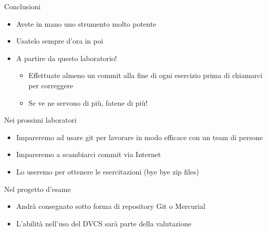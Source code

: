 \documentclass[presentation]{beamer}
\begin{document}
\begin{frame}{Conclusioni}
	\begin{itemize}
		\item Avete in mano uno strumento molto potente
		\item Usatelo sempre d'ora in poi
		\item A partire da questo laboratorio!
		\begin{itemize}
			\item Effettuate almeno un commit alla fine di ogni esercizio prima di chiamarci per correggere
			\item Se ve ne servono di più, fatene di più!
		\end{itemize}
	\end{itemize}
	\begin{block}{Nei prossimi laboratori}
		\begin{itemize}
			\item Impareremo ad usare git per lavorare in modo efficace con un team di persone
			\item Impareremo a scambiarci commit via Internet
			\item Lo useremo per ottenere le esercitazioni (bye bye zip files)
		\end{itemize}
	\end{block}
	\begin{block}{Nel progetto d'esame}
		\begin{itemize}
			\item Andrà consegnato sotto forma di repository Git o Mercurial
			\item L'abilità nell'uso del DVCS sarà parte della valutazione
		\end{itemize}
	\end{block}
\end{frame}
\end{document}
